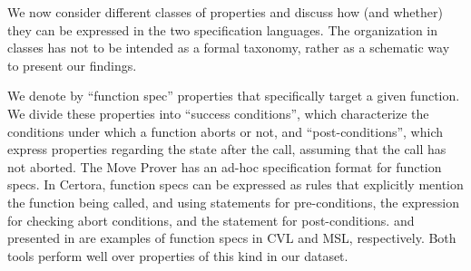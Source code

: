 
We now consider different classes of properties and discuss how (and whether) they can be expressed in the two specification languages. 
The organization in classes has not to be intended as a formal taxonomy,
rather as a schematic way to present our findings.








 We denote by ``{function spec}'' properties that specifically target  a given function.
We divide these properties into ``{success conditions}'', which characterize the conditions under which a function aborts or not, and ``{post-conditions}'', which express properties regarding the state after the call, assuming that the call has not aborted. 
The Move Prover has an ad-hoc specification format for function specs. 
In Certora, function specs can be expressed as rules that explicitly mention the function being called, %
and using  statements for pre-conditions, the expression  for checking abort conditions, and the statement  for post-conditions. 
 and  presented in  are examples of function specs in CVL and MSL, respectively.
Both tools perform well over properties of this kind in our dataset. 

